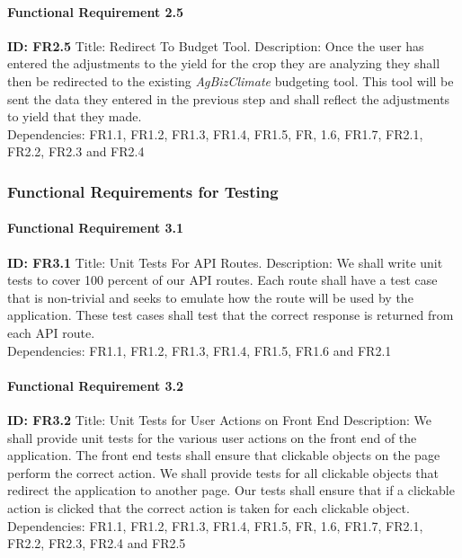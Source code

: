 \documentclass[onecolumn, draftclsnofoot,10pt, compsoc]{article}
\begin{document}
				\paragraph{Functional Requirement 2.5}
					\textbf{ID: FR2.5}\hfill \break
					Title: Redirect To Budget Tool.\hfill \break
					Description: Once the user has entered the adjustments to the yield for the crop they are analyzing they shall then be redirected to the existing \textit{AgBizClimate} budgeting tool. This tool will be sent the data they entered in the previous step and shall reflect the adjustments to yield that they made.\\
					Dependencies: FR1.1, FR1.2, FR1.3, FR1.4, FR1.5, FR, 1.6, FR1.7, FR2.1, FR2.2, FR2.3 and FR2.4\hfill \break
			\subsubsection{Functional Requirements for Testing}
				\paragraph{Functional Requirement 3.1}
				\textbf{ID: FR3.1}\hfill \break
				Title: Unit Tests For API Routes.
				Description: We shall write unit tests to cover 100 percent of our API routes. Each route shall have a test case that is non-trivial and seeks to emulate how the route will be used by the application. These test cases shall test that the correct response is returned from each API route.\\
				Dependencies: FR1.1, FR1.2, FR1.3, FR1.4, FR1.5, FR1.6 and FR2.1\hfill \break
				\paragraph{Functional Requirement 3.2}
				\textbf{ID: FR3.2}\hfill \break
				Title: Unit Tests for User Actions on Front End \hfill \break
				Description: We shall provide unit tests for the various user actions on the front end of the application. The front end tests shall ensure that clickable objects on the page perform the correct action. We shall provide tests for all clickable objects that redirect the application to another page. Our tests shall ensure that if a clickable action is clicked that the correct action is taken for each clickable object.\\
				Dependencies:  FR1.1, FR1.2, FR1.3, FR1.4, FR1.5, FR, 1.6, FR1.7, FR2.1, FR2.2, FR2.3, FR2.4 and FR2.5\hfill \break
\end{document}
